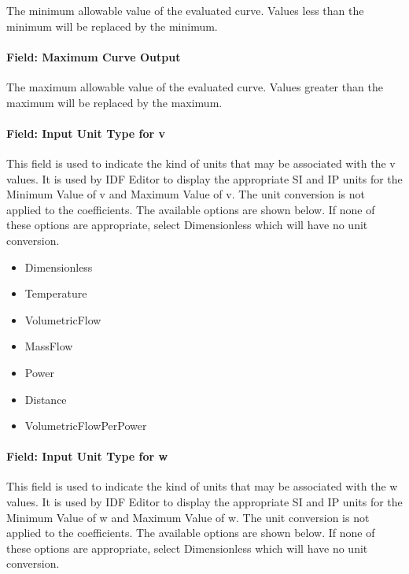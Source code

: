 The minimum allowable value of the evaluated curve. Values less than the minimum will be replaced by the minimum.

\paragraph{Field: Maximum Curve Output}\label{field-maximum-curve-output-quintlinear}

The maximum allowable value of the evaluated curve. Values greater than the maximum will be replaced by the maximum.

\paragraph{Field: Input Unit Type for v}\label{field-input-unit-type-for-v}

This field is used to indicate the kind of units that may be associated with the v values. It is used by IDF Editor to display the appropriate SI and IP units for the Minimum Value of v and Maximum Value of v. The unit conversion is not applied to the coefficients. The available options are shown below. If none of these options are appropriate, select Dimensionless which will have no unit conversion.

\begin{itemize}
\item
  Dimensionless
\item
  Temperature
\item
  VolumetricFlow
\item
  MassFlow
\item
  Power
\item
  Distance
\item
  VolumetricFlowPerPower
\end{itemize}

\paragraph{Field: Input Unit Type for w}\label{field-input-unit-type-for-w-1}

This field is used to indicate the kind of units that may be associated with the w values. It is used by IDF Editor to display the appropriate SI and IP units for the Minimum Value of w and Maximum Value of w. The unit conversion is not applied to the coefficients. The available options are shown below. If none of these options are appropriate, select Dimensionless which will have no unit conversion.

